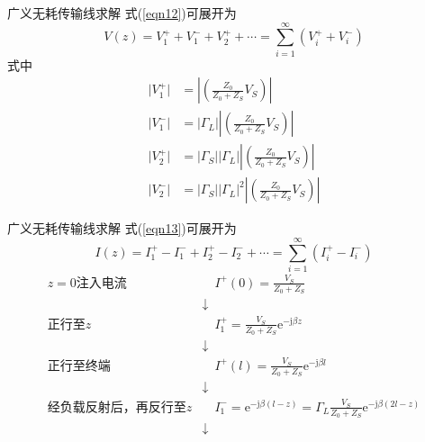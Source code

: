 \begin{frame}{广义无耗传输线求解}
  式(\ref{eqn12})可展开为
  $$V(z)=V_1^++V_1^-+V_2^++\cdots=\sum_{i=1}^{\infty}(V_i^++V_i^-)$$
  式中
  \begin{align*}
    \lvert V_1^+\rvert & = \left\lvert \left(\frac{Z_0}{Z_0+Z_S}V_S\right)\right\rvert                                           \\
    \lvert V_1^-\rvert & = \lvert\Gamma_L\rvert\left\lvert \left(\frac{Z_0}{Z_0+Z_S}V_S\right)\right\rvert                       \\
    \lvert V_2^+\rvert & = \lvert\Gamma_S\rvert\lvert\Gamma_L\rvert\left\lvert \left(\frac{Z_0}{Z_0+Z_S}V_S\right)\right\rvert   \\
    \lvert V_2^-\rvert & = \lvert\Gamma_S\rvert\lvert\Gamma_L\rvert^2\left\lvert \left(\frac{Z_0}{Z_0+Z_S}V_S\right)\right\rvert
  \end{align*}
\end{frame}

\begin{frame}{广义无耗传输线求解}
  式(\ref{eqn13})可展开为
  $$I(z)=I_1^+-I_1^-+I_2^+-I_2^-+\cdots=\sum_{i=1}^{\infty}(I_i^+-I_i^-)$$
  \begin{align*}
    z=0\text{注入电流}      & \quad I^+(0)=\frac{V_S}{Z_0+Z_S}                                                                                \\
                        & \downarrow                                                                                                      \\
    \text{正行至}z         & \quad I_1^+=\frac{V_S}{Z_0+Z_S}\mathrm{e}^{-\mathrm{j}\beta z}                                                  \\
                        & \downarrow                                                                                                      \\
    \text{正行至终端}        & \quad I^+(l)=\frac{V_S}{Z_0+Z_S}\mathrm{e}^{-\mathrm{j}\beta l}                                                 \\
                        & \downarrow                                                                                                      \\
    \text{经负载反射后，再反行至}z & \quad I_1^-=\mathrm{e}^{-\mathrm{j}\beta (l-z)}=\Gamma_L\frac{V_S}{Z_0+Z_S}\mathrm{e}^{-\mathrm{j}\beta (2l-z)} \\
                        & \downarrow
  \end{align*}
\end{frame}

